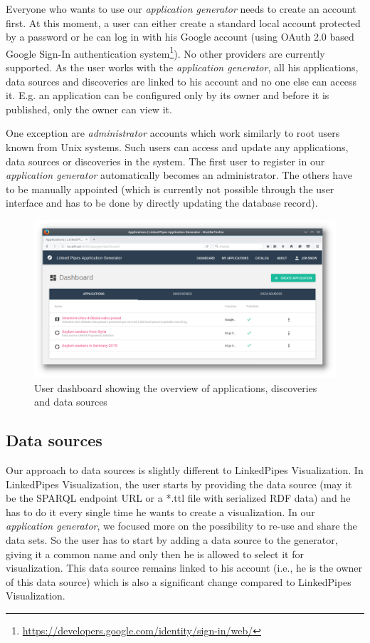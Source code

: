 Everyone who wants to use our \emph{application generator} needs to create an account first. At this moment, a user can either create a standard local account protected by a password or he can log in with his Google account (using OAuth 2.0 based Google Sign-In authentication system\footnote{\url{https://developers.google.com/identity/sign-in/web/}}). No other providers are currently supported. As the user works with the \emph{application generator}, all his applications, data sources and discoveries are linked to his account and no one else can access it. E.g. an application can be configured only by its owner and before it is published, only the owner can view it.

One exception are \emph{administrator} accounts which work similarly to root users known from Unix systems. Such users can access and update any applications, data sources or discoveries in the system. The first user to register in our \emph{application generator} automatically becomes an administrator. The others have to be manually appointed (which is currently not possible through the user interface and has to be done by directly updating the database record).

\begin{figure}
	\centering
	\includegraphics[width=145mm]{img/05_dashboard}
	\caption{User dashboard showing the overview of applications, discoveries and data sources}
    \label{fig:dashboard}
\end{figure}

\subsection{Data sources}

Our  approach to data sources is slightly different to LinkedPipes Visualization. In LinkedPipes Visualization, the user starts by providing the data source (may it be the SPARQL endpoint URL or a *.ttl file with serialized RDF data) and he has to do it every single time he wants to create a visualization. In our \emph{application generator}, we focused more on the possibility to re-use and share the data sets. So the user has to start by adding a data source to the generator, giving it a common name and only then he is allowed to select it for visualization. This data source remains linked to his account (i.e., he is the owner of this data source) which is also a significant change compared to LinkedPipes Visualization.

